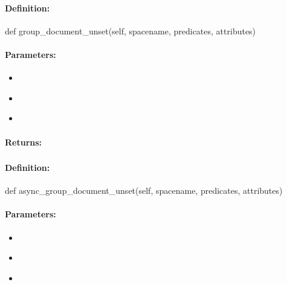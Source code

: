 \paragraph{Definition:}
\begin{pythoncode}
def group_document_unset(self, spacename, predicates, attributes)
\end{pythoncode}

\paragraph{Parameters:}
\begin{itemize}[noitemsep]
\item {}\\

\item {}\\

\item {}\\

\end{itemize}

\paragraph{Returns:}


\pagebreak
\subsubsection{}
\label{api:python:async_group_document_unset}


\paragraph{Definition:}
\begin{pythoncode}
def async_group_document_unset(self, spacename, predicates, attributes)
\end{pythoncode}

\paragraph{Parameters:}
\begin{itemize}[noitemsep]
\item {}\\

\item {}\\

\item {}\\

\end{itemize}

